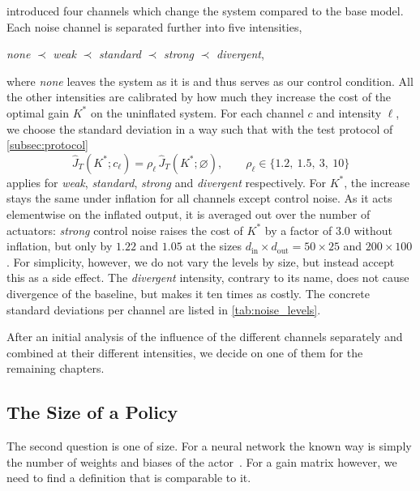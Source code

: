  introduced four channels which change the system
compared to the base model. Each noise channel is separated further
into five intensities,

\begin{center}
    \emph{none} $\prec$ \emph{weak} $\prec$ \emph{standard} $\prec$
    \emph{strong} $\prec$ \emph{divergent},
\end{center}

where \emph{none} leaves the system as it is and thus serves as our
control condition. All the other intensities are calibrated by how much
they increase the cost of the optimal gain $K^{*}$ on the uninflated system. 
For each channel $c$ and intensity $\ell$, we choose the standard deviation 
in a way such that with the test protocol of \cref{subsec:protocol}
\begin{equation}
    \label{eq:noise-calibration}
    \hat{J}_T(K^{*}; c_{\ell}) = \rho_{\ell}\, \hat{J}_T(K^{*}; \varnothing),
    \qquad
    \rho_{\ell} \in \{1.2,\ 1.5,\ 3,\ 10\}
\end{equation}
applies for \emph{weak}, \emph{standard}, \emph{strong} and \emph{divergent}
respectively.
For $K^{*}$, the increase stays the same under inflation for all channels
except control noise. As it acts elementwise on the inflated output, it
is averaged out over the number of actuators: \emph{strong} control noise raises the
cost of $K^{*}$ by a factor of $3.0$ without inflation, but only by $1.22$ and
$1.05$ at the sizes $d_{\mathrm{in}} \times d_{\mathrm{out}} = 50 \times 25$ and $200 \times 100$.
For simplicity, however, we do not vary the levels by size, but instead accept this
as a side effect.
The \emph{divergent} intensity, contrary to its name,
does not cause divergence of the baseline, but makes it ten times as costly. 
The concrete standard deviations per channel are listed in 
\cref{tab:noise_levels}.

After an initial analysis of the influence of the different channels
separately and combined at their different intensities, we decide on
one of them for the remaining chapters.

\subsection{The Size of a Policy}
\label{subsec:policy-size}

The second question is one of size. For a neural network the known way 
is simply the number of weights and biases of the actor~.
For a gain matrix however, we need to find a definition that is comparable to it.

